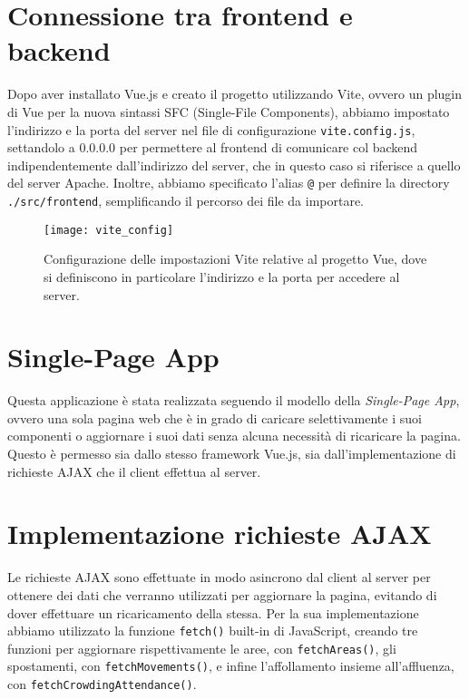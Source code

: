 \section{Connessione tra frontend e backend}
Dopo aver installato Vue.js e creato il progetto utilizzando Vite, ovvero un plugin di Vue per la nuova sintassi SFC (Single-File Components), abbiamo impostato l'indirizzo e la porta del server nel file di configurazione \Verb_vite.config.js_, settandolo a 0.0.0.0 per permettere al frontend di comunicare col backend indipendentemente dall'indirizzo del server, che in questo caso si riferisce a quello del server Apache. Inoltre, abbiamo specificato l'alias \Verb_@_ per definire la directory \Verb_./src/frontend_, semplificando il percorso dei file da importare.

\begin{figure}[H]
    \centering
    \texttt{[image: vite\_config]}
    \caption[Configurazione delle impostazioni Vite]{Configurazione delle impostazioni Vite relative al progetto Vue, dove si definiscono in particolare l'indirizzo e la porta per accedere al server.}
    \label{fig:vite_config}
\end{figure}

\section{Single-Page App}
Questa applicazione è stata realizzata seguendo il modello della \textit{Single-Page App}, ovvero una sola pagina web che è in grado di caricare selettivamente i suoi componenti o aggiornare i suoi dati senza alcuna necessità di ricaricare la pagina. Questo è permesso sia dallo stesso framework Vue.js, sia dall'implementazione di richieste AJAX che il client effettua al server.

\section{Implementazione richieste AJAX}
Le richieste AJAX sono effettuate in modo asincrono dal client al server per ottenere dei dati che verranno utilizzati per aggiornare la pagina, evitando di dover effettuare un ricaricamento della stessa. Per la sua implementazione abbiamo utilizzato la funzione \Verb_fetch()_ built-in di JavaScript, creando tre funzioni per aggiornare rispettivamente le aree, con \Verb_fetchAreas()_, gli spostamenti, con \Verb_fetchMovements()_, e infine l'affollamento insieme all'affluenza, con \Verb_fetchCrowdingAttendance()_. 

